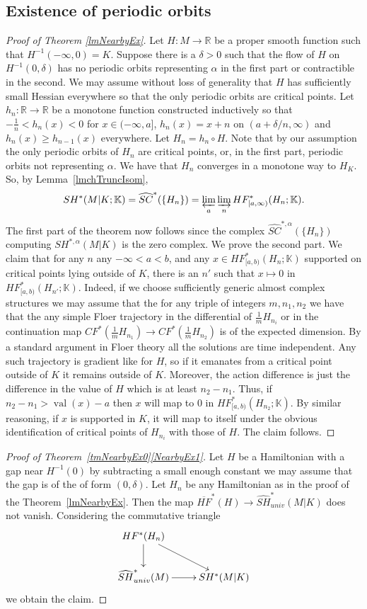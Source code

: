 \documentclass[11pt]{amsart}
\newcommand{\R}{\mathbb{R}}
\newcommand{\K}{\mathbb{K}}
\DeclareMathOperator{\val}{val}
\theoremstyle{definition}
\theoremstyle{remark}
\begin{document}
\subsection{Existence of periodic orbits}\label{subsecNearby}
\begin{proof}[Proof of Theorem \ref{lmNearbyEx}]
Let $H:M\to\R$ be a proper smooth function such that $H^{-1}(-\infty,0)=K$. Suppose there is a $\delta>0$ such that the flow of $H$ on $H^{-1}(0,\delta)$ has no periodic orbits representing $\alpha$ in the first part or contractible in the second. We may assume without loss of generality that $H$ has sufficiently small Hessian everywhere so that the only periodic orbits are critical points. Let $h_n:\R\to\R$ be a monotone function constructed inductively so that $-\frac1{n}<h_n(x)<0$ for $x\in(-\infty,a]$, $h_n(x)=x+n$ on $(a+\delta/n,\infty)$ and $h_n(x)\geq h_{n-1}(x)$ everywhere. Let $H_n=h_n\circ H$. Note that by our assumption the only periodic orbits of $H_n$ are critical points, or, in the first part, periodic orbits not representing $\alpha$. We have that $H_n$ converges in a monotone way to $H_K$. So, by Lemma~\ref{lmchTruncIsom},
\[
SH^*(M|K;\K)=\widehat{SC}^{*}(\{H_n\})=\varprojlim_a\varinjlim_n HF^*_{[a,\infty)}(H_n;\K).
\]
The first part of the theorem now follows since the complex $\widehat{SC}^{*,\alpha}(\{H_n\})$ computing $SH^{*,\alpha}(M|K)$ is the zero complex. We prove the second part. We claim that for any $n$ any $-\infty<a<b$, and any $x\in HF^*_{[a,b)}(H_n;\K)$ supported on critical points lying outside of $K$, there is an $n'$ such that $x\mapsto 0$ in $HF^*_{[a,b)}(H_{n'};\K)$. Indeed, if we choose sufficiently generic almost complex structures we may assume that the for any triple of integers $m,n_1,n_2$ we have that the any simple Floer trajectory in the differential of $\frac1mH_{n_i}$ or in the continuation map $CF^*(\frac1m H_{n_1})\to CF^*(\frac1m H_{n_2})$ is of the expected dimension. By a standard argument in Floer theory all the solutions are time independent. Any such trajectory is gradient like for $H$, so if it emanates from a critical point outside of $K$ it remains outside of $K$. Moreover, the action difference is just the difference in the value of $H$ which is at least $n_2-n_1$. Thus, if $n_2-n_1>\val(x)-a$ then $x$ will map to $0$ in $HF^*_{[a,b)}(H_{n_2};\K)$. By similar reasoning, if $x$ is supported in $K$, it will map to itself under the obvious identification of critical points of $H_{n_i}$ with those of $H$. The claim follows.
\end{proof}
\begin{proof}[Proof of Theorem~\ref{tmNearbyEx0}\ref{NearbyEx1}]

Let $H$ be a Hamiltonian with a gap near $H^{-1}(0)$ by subtracting a small enough constant we may assume that the gap is of the of form $(0,\delta)$. Let $H_n$ be any Hamiltonian as in the proof of the Theorem~\ref{lmNearbyEx}. Then the map $\overline{HF}^*(H)\to \widehat{SH}^*_{univ}(M|K)$ does not vanish.
Considering the commutative triangle
\[
\xymatrix{
HF^*(H_n)\ar[d]\ar[dr]& \\
\widehat{SH}^*_{univ}(M) \ar[r] &SH^*(M|K)
}
\]
we obtain the claim.
\end{proof}
\end{document}
